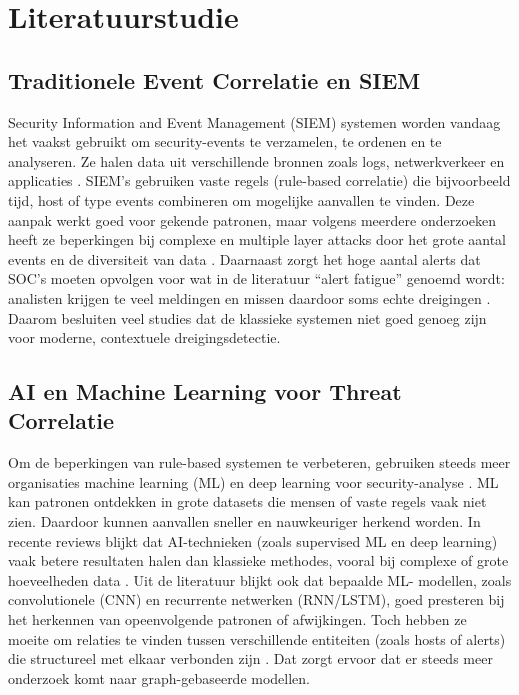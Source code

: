 
\section{Literatuurstudie}%
\label{sec:literatuurstudie}
\subsection{Traditionele Event Correlatie en SIEM}
Security Information and Event Management (SIEM) systemen worden vandaag het vaakst gebruikt om security-events te verzamelen, te ordenen en te analyseren. Ze halen data uit verschillende bronnen zoals logs, netwerkverkeer en applicaties \autocite{Vielberth2025}. SIEM’s gebruiken vaste regels (rule-based correlatie) die bijvoorbeeld tijd, host of type events combineren om mogelijke aanvallen te vinden. Deze aanpak werkt goed voor gekende patronen, maar volgens meerdere onderzoeken heeft ze beperkingen bij complexe en multiple layer attacks door het grote aantal events en de diversiteit van data \autocite{IBM2024}.  
\newline
\newline
Daarnaast zorgt het hoge aantal alerts dat SOC’s moeten opvolgen voor wat in de literatuur “alert fatigue” genoemd wordt: analisten krijgen te veel meldingen en missen daardoor soms echte dreigingen \autocite{Makhinova2025}.  
\newline
\newline
Daarom besluiten veel studies dat de klassieke systemen niet goed genoeg zijn voor moderne, contextuele dreigingsdetectie.
\newline
\subsection{AI en Machine Learning voor \newline Threat Correlatie}
Om de beperkingen van rule-based systemen te verbeteren, gebruiken steeds meer organisaties machine learning (ML) en deep learning voor security-analyse \autocite{Gamage2025}.  
\newline
ML kan patronen ontdekken in grote datasets die mensen of vaste regels vaak niet zien. Daardoor kunnen aanvallen sneller en nauwkeuriger herkend worden. In recente reviews blijkt dat AI-technieken (zoals supervised ML en deep learning) vaak betere resultaten halen dan klassieke methodes, vooral bij complexe of grote hoeveelheden data \autocite{IBM2024}.  
\newline
\newline
Uit de literatuur blijkt ook dat bepaalde ML-
\newline
modellen, zoals convolutionele (CNN) en recurrente netwerken (RNN/LSTM), goed presteren bij het herkennen van opeenvolgende patronen of afwijkingen. Toch hebben ze moeite om relaties te vinden tussen verschillende entiteiten \newline (zoals hosts of alerts) die structureel met elkaar verbonden zijn \autocite{Gamage2025}. Dat zorgt ervoor dat er steeds meer onderzoek komt naar graph-gebaseerde modellen.
\newline
